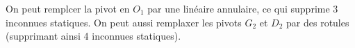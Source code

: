 On peut remplcer la pivot en $O_1$ par une linéaire annulaire, ce qui supprime 3 inconnues statiques. 
On peut aussi remplaxer les pivots $G_2$ et $D_2$ par des rotules (supprimant ainsi 4 inconnues statiques).
\else
\fi
 

\ifprof
\else
{}
\fi